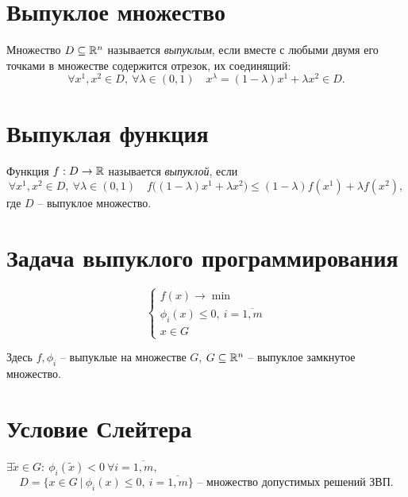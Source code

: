 \section{Выпуклое множество}

\begin{definition}
	Множество $D \subseteq \mathbb{R}^{n}$ называется \emph{выпуклым}, если вместе с любыми двумя его точками в множестве содержится отрезок, их соединящий:
	\[
		\forall x^{1}, x^{2} \in D, \ \forall \lambda \in (0,1) \quad x^{\lambda} = (1 - \lambda)x^{1} + \lambda x^{2} \in D.
	\]
\end{definition}

\section{Выпуклая функция}

\begin{definition}
	Функция $f : D \rightarrow \mathbb{R}$ называется \emph{выпуклой}, если
	\[
		\forall x^{1},x^{2} \in D, \ \forall \lambda \in (0,1) \quad f \big((1-\lambda)x^{1} + \lambda x^{2}\big) \leqslant (1-\lambda)f(x^{1}) + \lambda f(x^{2}),
	\]
	где $D$ -- выпуклое множество.
\end{definition}

\section{Задача выпуклого программирования}

\begin{task}
	\[
		\left\{\begin{array}{l}
			f(x) \rightarrow \min                       \\
			\phi_i(x) \leqslant 0, \ i = \overline{1,m} \\
			x \in G
		\end{array}\right.
	\]

	Здесь $f,\phi_i$ -- выпуклые на множестве $G$, $G \subseteq \mathbb{R}^n$ -- выпуклое замкнутое множество.
\end{task}

\section{Условие Слейтера}

\begin{note}
	$\exists \widetilde{x} \in G: \ \phi_i(\widetilde{x}) < 0 \ \forall i = \overline{1,m}$,
	\[
		D = \big\{x \in G \ | \ \phi_i(x) \leqslant 0, \ i = \overline{1,m}\big\} \text{ -- множество допустимых решений ЗВП}.
	\]
\end{note}

